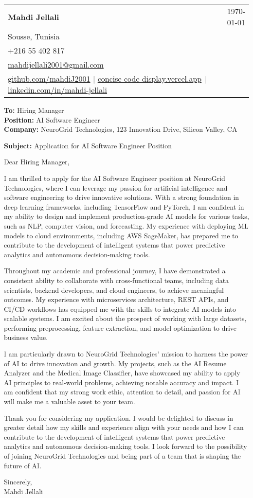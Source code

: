 \documentclass[letterpaper,11pt]{article}
\makeatletter
\newcommand{\letterHeading}[5]{
    \begin{tabular*}{\textwidth}{l@{\extracolsep{\fill}}r}
    \textbf{\Large #1} & #5 \\  %
    #2 & \\
    #3 & \\
    #4 & \\
    \end{tabular*}
    \vspace{15pt}
}
\newcommand{\letterRecipient}[3]{
    \textbf{\large To:} #1 \\
    \textbf{\large Position:} #2 \\
    \textbf{\large Company:} #3 \\
    \vspace{12pt}
}
\newcommand{\letterSubject}[1]{
    \textbf{\large Subject:} #1 \\
    \vspace{15pt}
}
\makeatother
\begin{document}
    \letterHeading
    {Mahdi Jellali}
    {Sousse, Tunisia}
    {+216 55 402 817 \\ \href{mailto:mahdijellali2001@gmail.com}{mahdijellali2001@gmail.com}}
    {\href{https://github.com/mahdiJ2001}{github.com/mahdiJ2001} $|$ \href{https://concise-code-display.vercel.app/}{concise-code-display.vercel.app} $|$ \href{https://www.linkedin.com/in/mahdi-jellali/}{linkedin.com/in/mahdi-jellali}}
    {\today}

    \letterRecipient
    {Hiring Manager}
    {AI Software Engineer}
    {NeuroGrid Technologies, 123 Innovation Drive, Silicon Valley, CA}

    \letterSubject{Application for AI Software Engineer Position}

    Dear Hiring Manager,

    I am thrilled to apply for the AI Software Engineer position at NeuroGrid Technologies, where I can leverage my passion for artificial intelligence and software engineering to drive innovative solutions. With a strong foundation in deep learning frameworks, including TensorFlow and PyTorch, I am confident in my ability to design and implement production-grade AI models for various tasks, such as NLP, computer vision, and forecasting. My experience with deploying ML models to cloud environments, including AWS SageMaker, has prepared me to contribute to the development of intelligent systems that power predictive analytics and autonomous decision-making tools.

    Throughout my academic and professional journey, I have demonstrated a consistent ability to collaborate with cross-functional teams, including data scientists, backend developers, and cloud engineers, to achieve meaningful outcomes. My experience with microservices architecture, REST APIs, and CI/CD workflows has equipped me with the skills to integrate AI models into scalable systems. I am excited about the prospect of working with large datasets, performing preprocessing, feature extraction, and model optimization to drive business value.

    I am particularly drawn to NeuroGrid Technologies' mission to harness the power of AI to drive innovation and growth. My projects, such as the AI Resume Analyzer and the Medical Image Classifier, have showcased my ability to apply AI principles to real-world problems, achieving notable accuracy and impact. I am confident that my strong work ethic, attention to detail, and passion for AI will make me a valuable asset to your team.

    Thank you for considering my application. I would be delighted to discuss in greater detail how my skills and experience align with your needs and how I can contribute to the development of intelligent systems that power predictive analytics and autonomous decision-making tools. I look forward to the possibility of joining NeuroGrid Technologies and being part of a team that is shaping the future of AI.

    Sincerely,\\[12pt]

    Mahdi Jellali
\end{document}

